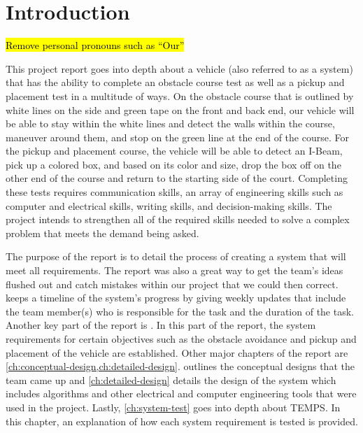 \documentclass[11pt]{report}
\begin{document}
\chapter{Introduction}\label{ch:introduction}

\hl{Remove personal pronouns such as ``Our''}

This project report goes into depth about a vehicle (also referred to as a system) that has the ability to complete an obstacle course test as well as a pickup and placement test in a multitude of ways. On the obstacle course that is outlined by white lines on the side and green tape on the front and back end, our vehicle will be able to stay within the white lines and detect the walls within the course, maneuver around them, and stop on the green line at the end of the course. For the pickup and placement course, the vehicle will be able to detect an I-Beam, pick up a colored box, and based on its color and size, drop the box off on the other end of the course and return to the starting side of the court. Completing these tests requires communication skills, an array of engineering skills such as computer and electrical skills, writing skills, and decision-making skills. The project intends to strengthen all of the required skills needed to solve a complex problem that meets the demand being asked.

\par The purpose of the report is to detail the process of creating a system that will meet all requirements. The report was also a great way to get the team’s ideas flushed out and catch mistakes within our project that we could then correct.  keeps a timeline of the system’s progress by giving weekly updates that include the team member(s) who is responsible for the task and the duration of the task. Another key part of the report is . In this part of the report, the system requirements for certain objectives such as the obstacle avoidance and pickup and placement of the vehicle are established. Other major chapters of the report are \cref{ch:conceptual-design,ch:detailed-design}.  outlines the conceptual designs that the team came up and \cref{ch:detailed-design} details the design of the system which includes algorithms and other electrical and computer engineering tools that were used in the project. Lastly, \cref{ch:system-test} goes into depth about \gls{TEMPS}. In this chapter, an explanation of how each system requirement is tested is provided.
\end{document}
